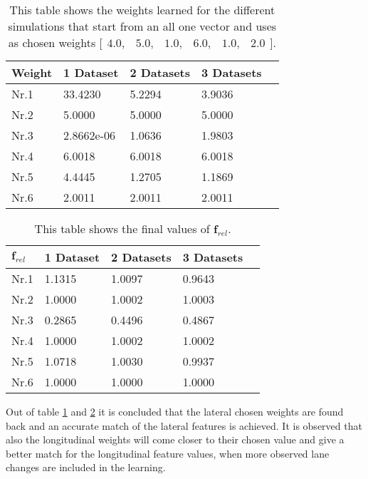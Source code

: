 \begin{table}[h!]
	\centering
	\begin{tabular}{@{}llllr@{}} \toprule
		\textbf{Weight}   & 1 Dataset    & 2 Datasets     & 3 Datasets\\ \midrule
		Nr.1       		  &33.4230       & 5.2294       & 3.9036		\\
		Nr.2              & 5.0000         & 5.0000          & 5.0000       \\
		Nr.3              & 2.8662e-06     & 1.0636      & 1.9803      \\
		Nr.4              & 6.0018           & 6.0018            &   6.0018     \\
		Nr.5              & 4.4445     & 1.2705      & 1.1869       \\
		Nr.6              & 2.0011        & 2.0011         & 2.0011      \\ \bottomrule
	\end{tabular}
	\caption{This table shows the weights learned for the different simulations that start from an all one vector and uses as chosen weights $\bigl[ \begin{smallmatrix} 4.0,&5.0,&1.0,&6.0,&1.0,&2.0\end{smallmatrix}\bigr]$.}
	\label{tab:complex_learning_weights}
\end{table}

\begin{table}[h!]
	\centering
	\begin{tabular}{@{}llllr@{}} \toprule
		$\bm{f}_{rel}$   & 1 Dataset    & 2 Datasets     & 3 Datasets\\ \midrule
		Nr.1       		  &1.1315        & 1.0097       & 0.9643		\\
		Nr.2              & 1.0000         & 1.0002     & 1.0003       \\
		Nr.3              & 0.2865     & 0.4496     	& 0.4867      \\
		Nr.4              & 1.0000           & 1.0002   &   1.0002     \\
		Nr.5              & 1.0718     & 1.0030         & 0.9937       \\
		Nr.6              & 1.0000        & 1.0000      & 1.0000     \\ \bottomrule
	\end{tabular}
	\caption{This table shows the final values of $\bm{f}_{rel}$.}
	\label{tab:complex_frel}
\end{table}

Out of table \ref{tab:complex_learning_weights} and \ref{tab:complex_frel} it is concluded that the lateral chosen weights are found back and an accurate match of the lateral features is achieved. It is observed that also the longitudinal weights will come closer to their chosen value and give a better match for the longitudinal feature values, when more observed lane changes are included in the learning.

